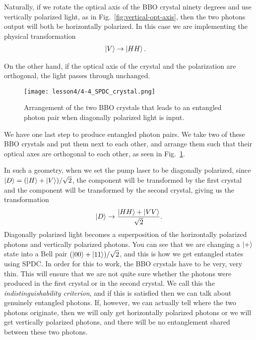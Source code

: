 Naturally, if we rotate the optical axis of the BBO crystal ninety degrees and use vertically polarized light, as in Fig.~\ref{fig:vertical-opt-axis}, then the two photons output will both be horizontally polarized.  In this case we are implementing the physical transformation
\begin{equation}
\begin{aligned}
\left| V \right\rangle &\rightarrow \left| HH \right\rangle.
\end{aligned}
\end{equation}

On the other hand, if the optical axis of the crystal and the polarization are orthogonal, the light passes through unchanged.

\begin{figure}[t]
    \centering
    \texttt{[image: lesson4/4-4\_SPDC\_crystal.png]}
    \caption[BBO crystal arrangement]{Arrangement of the two BBO crystals that leads to an entangled photon pair when diagonally polarized light is input.}
    \label{fig:4-4_SPDC_crystals}
\end{figure}

We have one last step to produce entangled photon pairs.  We take two of these BBO crystals and put them next to each other, and arrange them such that their optical axes are orthogonal to each other, as seen in Fig.~\ref{fig:4-4_SPDC_crystals}.

In such a geometry, when we set the pump laser to be diagonally polarized, since $\left| D \right\rangle = (\left| H \right\rangle+\left| V \right\rangle)/\sqrt{2}$, the  component will be transformed by the first crystal and the  component will be transformed by the second crystal, giving us the  transformation
\begin{equation}
    \left| D \right\rangle \rightarrow \frac{\left| HH \right\rangle+\left| VV \right\rangle}{\sqrt{2}}.
\end{equation}
Diagonally polarized light becomes a superposition of the horizontally polarized photons and vertically polarized photons. You can see that we are changing a $\left| + \right\rangle$ state into a Bell pair $(\left| 00 \right\rangle+\left| 11 \right\rangle)/\sqrt{2}$, and this is how we get entangled states using SPDC.  In order for this to work, the BBO crystals have to be very, very thin. This will ensure that we are not quite sure whether the photons were produced in the first crystal or in the second crystal. We call this the \emph{indistinguishability criterion}, and if this is satisfied then we can talk about genuinely entangled photons. If, however, we can actually tell where the two photons originate, then we will only get horizontally polarized photons or we will get vertically polarized photons, and there will be no entanglement shared between these two photons. 

